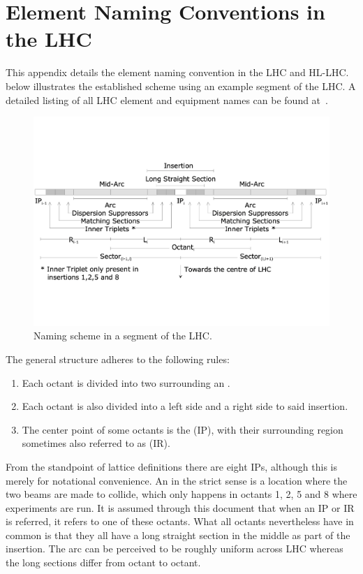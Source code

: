 \chapter{Element Naming Conventions in the LHC}
\label{appendix:naming_conventions}


This appendix details the element naming convention in the LHC and HL-LHC.
 below illustrates the established scheme using an example segment of the LHC.
A detailed listing of all LHC element and equipment names can be found at~\cite{CERN:Equipment_Codes}.

\begin{figure}[h]
    \centering
    \includegraphics*[width=0.9\linewidth]{Figures/Appendices/LHC_naming_scheme.pdf}
    \caption{Naming scheme in a segment of the LHC.}
    \label{figure:lhc_segment_naming_scheme}
\end{figure}

The general structure adheres to the following rules:
\begin{enumerate}
    \item Each octant is divided into two  surrounding an .
    \item Each octant is also divided into a left side and a right side to said insertion.
    \item The center point of some octants is the  (IP), with their surrounding region sometimes also referred to as  (IR).
\end{enumerate}

From the standpoint of lattice definitions there are eight IPs, although this is merely for notational convenience. 
An  in the strict sense is a location where the two beams are made to collide, which only happens in octants 1, 2, 5 and 8 where experiments are run.
It is assumed through this document that when an IP or IR is referred, it refers to one of these octants.
What all octants nevertheless have in common is that they all have a long straight section in the middle as part of the insertion.
The arc can be perceived to be roughly uniform across LHC whereas the long sections differ from octant to octant.



